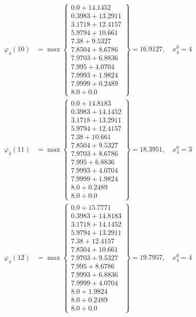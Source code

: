 \documentclass{article}
\begin{document}
\begin{align*}
\varphi_{4}(10) &= \max \left\{ \begin{array}{c}
0.0 + 14.1452 \\
 0.3983 + 13.2911 \\
 3.1718 + 12.4157 \\
 5.9794 + 10.661 \\
 7.38 + 9.5327 \\
 7.8504 + 8.6786 \\
 7.9703 + 6.8836 \\
 7.995 + 4.0704 \\
 7.9993 + 1.9824 \\
 7.9999 + 0.2489 \\
 8.0 + 0.0
\end{array} \right\}=16.9127, \quad x_{4}^0=4\\
  
\varphi_{4}(11) &= \max \left\{ \begin{array}{c}
0.0 + 14.8183 \\
 0.3983 + 14.1452 \\
 3.1718 + 13.2911 \\
 5.9794 + 12.4157 \\
 7.38 + 10.661 \\
 7.8504 + 9.5327 \\
 7.9703 + 8.6786 \\
 7.995 + 6.8836 \\
 7.9993 + 4.0704 \\
 7.9999 + 1.9824 \\
 8.0 + 0.2489 \\
 8.0 + 0.0
\end{array} \right\}=18.3951, \quad x_{4}^0=3\\
  
\varphi_{4}(12) &= \max \left\{ \begin{array}{c}
0.0 + 15.7771 \\
 0.3983 + 14.8183 \\
 3.1718 + 14.1452 \\
 5.9794 + 13.2911 \\
 7.38 + 12.4157 \\
 7.8504 + 10.661 \\
 7.9703 + 9.5327 \\
 7.995 + 8.6786 \\
 7.9993 + 6.8836 \\
 7.9999 + 4.0704 \\
 8.0 + 1.9824 \\
 8.0 + 0.2489 \\
 8.0 + 0.0
\end{array} \right\}=19.7957, \quad x_{4}^0=4\\
  

\end{align*}
\end{document}
